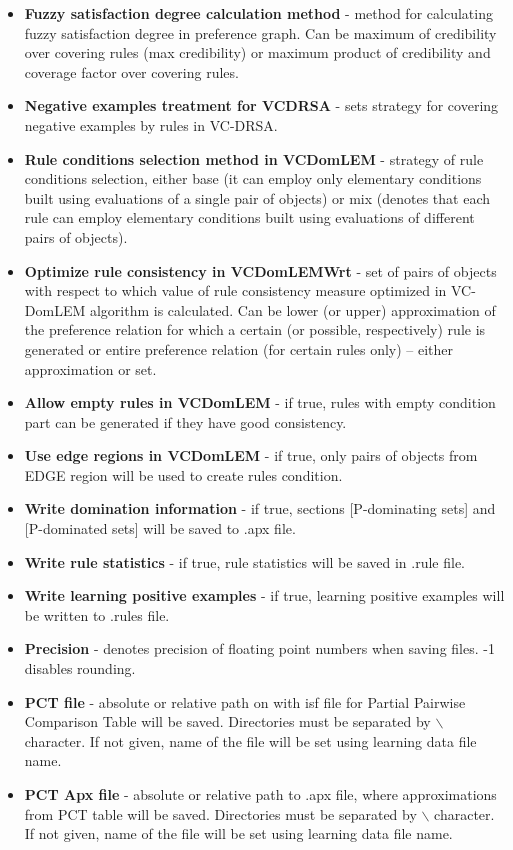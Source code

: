 \begin{itemize}
	\item \textbf{Fuzzy satisfaction degree calculation method} - method for calculating fuzzy satisfaction degree in preference graph. Can be maximum of credibility over covering rules (max credibility) or maximum product of credibility and coverage factor over covering rules.
	\item \textbf{Negative examples treatment for VCDRSA} - sets strategy for covering negative examples by rules in VC-DRSA.
	\item \textbf{Rule conditions selection method in VCDomLEM} - strategy of rule conditions selection, either base (it can employ only elementary conditions built using evaluations of a single pair of objects) or mix (denotes that each rule can employ elementary conditions built using evaluations of different pairs of objects).
	\item \textbf{Optimize rule consistency in VCDomLEMWrt} - set of pairs of objects with respect to which value of rule consistency measure optimized in VC-DomLEM algorithm is calculated. Can be lower (or upper) approximation of the preference relation for which a certain (or possible, respectively) rule is generated or entire preference relation (for certain rules only) – either approximation or set.
	\item \textbf{Allow empty rules in VCDomLEM} - if true, rules with empty condition part can be generated if they have good consistency.
	\item \textbf{Use edge regions in VCDomLEM} - if true, only pairs of objects from EDGE region will be used to create rules condition.
	\item \textbf{Write domination information} - if true, sections [P-dominating sets] and [P-dominated sets] will be saved to .apx file.
	\item \textbf{Write rule statistics} - if true, rule statistics will be saved in .rule file.
	\item \textbf{Write learning positive examples} - if true, learning positive examples will be written to .rules file.
	\item \textbf{Precision} - denotes precision of floating point numbers when saving files. -1 disables rounding.
	\item \textbf{PCT file} - absolute or relative path on with isf file for Partial Pairwise Comparison Table will be saved. Directories must be separated by $\backslash$ character. If not given, name of the file will be set using learning data file name.
	\item \textbf{PCT Apx file} - absolute or relative path to .apx file, where approximations from PCT table will be saved. Directories must be separated by $\backslash$ character. If not given, name of the file will be set using learning data file name.

\end{itemize}
